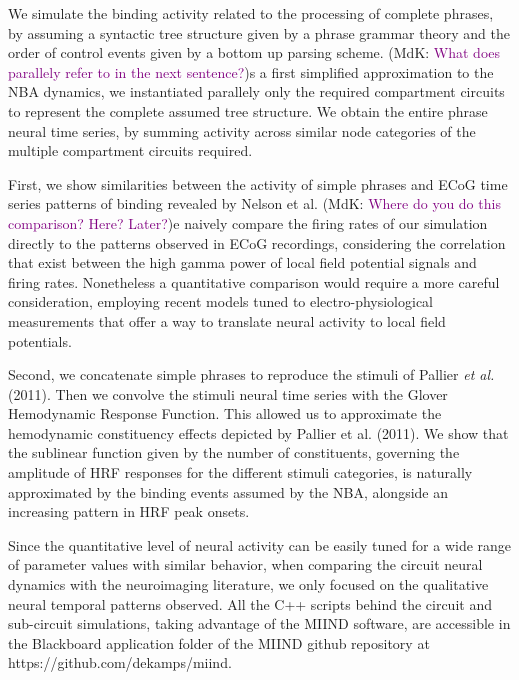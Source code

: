 \documentclass[10pt]{article}
\newcommand{\noteMdK}[2]{(MdK: \textcolor{purple}{#1})}
\begin{document}
We simulate the binding activity related to the processing of complete phrases, by assuming a syntactic tree structure given by a phrase grammar theory and the order of control events given by a bottom up parsing scheme.
\noteMdK{What does parallely refer to in the next sentence?}
As a first simplified approximation to the NBA dynamics, we instantiated parallely only the required compartment circuits to represent the complete assumed tree structure.
We obtain the entire phrase neural time series, by summing activity across similar node categories of the multiple compartment circuits required.

First, we show similarities between the activity of simple phrases and ECoG time series patterns of binding revealed by Nelson et al\cite{Nelson_2017}.
\noteMdK{Where do you do this comparison? Here? Later?}
We naively compare the firing rates of our simulation directly to the patterns observed in ECoG recordings, considering the correlation that exist between the high gamma power of local field potential signals and firing rates\cite{Ray_2011,Manning_2009}.
Nonetheless a quantitative comparison would require a more careful consideration, employing recent models tuned to electro-physiological measurements that offer a way to translate neural activity to local field potentials\cite{Mazzoni_2015,Hagen_2015}.

Second, we concatenate simple phrases to reproduce the stimuli of Pallier \emph{et al.} (2011)\cite{Pallier_2011}.
Then we convolve the stimuli neural time series with the Glover Hemodynamic Response Function\cite{Glover_1999}.
This allowed us to approximate the hemodynamic constituency effects depicted by Pallier et al. (2011)\cite{Pallier_2011}.
We show that the sublinear function given by the number of constituents, governing the amplitude of HRF responses for the different stimuli categories, is naturally approximated by the binding events assumed by the NBA, alongside an increasing pattern in HRF peak onsets.

Since the quantitative level of neural activity can be easily tuned for a wide range of parameter values with similar behavior, when comparing the circuit neural dynamics with the neuroimaging literature, we only focused on the qualitative neural temporal patterns observed.
All the C++ scripts behind the circuit and sub-circuit simulations, taking advantage of the MIIND software\cite{de_Kamps_2008}, are accessible in the Blackboard application folder of the MIIND github repository at https://github.com/dekamps/miind.
\end{document}
